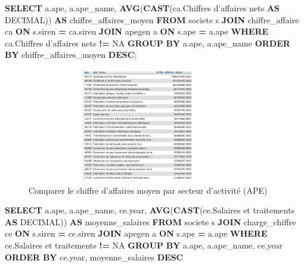 \documentclass[mstat,12pt]{unswthesis}
\newenvironment{Shaded}{\begin{snugshade}}{\end{snugshade}}
\newcommand{\DataTypeTok}[1]{\textcolor[rgb]{0.13,0.29,0.53}{#1}}
\newcommand{\FunctionTok}[1]{\textcolor[rgb]{0.13,0.29,0.53}{\textbf{#1}}}
\newcommand{\KeywordTok}[1]{\textcolor[rgb]{0.13,0.29,0.53}{\textbf{#1}}}
\newcommand{\NormalTok}[1]{#1}
\newcommand{\OperatorTok}[1]{\textcolor[rgb]{0.81,0.36,0.00}{\textbf{#1}}}
\newcommand{\StringTok}[1]{\textcolor[rgb]{0.31,0.60,0.02}{#1}}
\begin{document}
\begin{Shaded}
\begin{Highlighting}[]

\KeywordTok{SELECT} 
\NormalTok{  a.ape, }
\NormalTok{  a.ape\_name, }
  \FunctionTok{AVG}\NormalTok{(}\FunctionTok{CAST}\NormalTok{(ca.\textasciigrave{}Chiffres d’affaires nets\textasciigrave{} }\KeywordTok{AS} \DataTypeTok{DECIMAL}\NormalTok{)) }
  \KeywordTok{AS}\NormalTok{ chiffre\_affaires\_moyen }
\KeywordTok{FROM} 
\NormalTok{  societe s }
  \KeywordTok{JOIN}\NormalTok{ chiffre\_affaire ca }\KeywordTok{ON}\NormalTok{ s.siren }\OperatorTok{=}\NormalTok{ ca.siren }
  \KeywordTok{JOIN}\NormalTok{ apegen a }\KeywordTok{ON}\NormalTok{ s.ape }\OperatorTok{=}\NormalTok{ a.ape }
\KeywordTok{WHERE} 
\NormalTok{  ca.\textasciigrave{}Chiffres d’affaires nets\textasciigrave{} }\OperatorTok{!=} \StringTok{\textquotesingle{}NA\textquotesingle{}} 
\KeywordTok{GROUP} \KeywordTok{BY} 
\NormalTok{  a.ape, }
\NormalTok{  a.ape\_name }
\KeywordTok{ORDER} \KeywordTok{BY} 
\NormalTok{  chiffre\_affaires\_moyen }\KeywordTok{DESC}\NormalTok{;}
\end{Highlighting}
\end{Shaded}

\begin{figure}
\centering
\includegraphics[width=10cm,height=5cm]{image_sql/compere_APE.png}
\caption{Comparer le chiffre d'affaires moyen par secteur d'activité
(APE)}
\end{figure}

\begin{Shaded}
\begin{Highlighting}[]
\KeywordTok{SELECT} 
\NormalTok{  a.ape, }
\NormalTok{  a.ape\_name, }
\NormalTok{  ce.}\DataTypeTok{year}\NormalTok{, }
  \FunctionTok{AVG}\NormalTok{(}\FunctionTok{CAST}\NormalTok{(ce.\textasciigrave{}Salaires et traitements\textasciigrave{} }\KeywordTok{AS} \DataTypeTok{DECIMAL}\NormalTok{)) }\KeywordTok{AS}\NormalTok{ moyenne\_salaires }
\KeywordTok{FROM}\NormalTok{ societe s }\KeywordTok{JOIN}
\NormalTok{  charge\_chiffre ce }\KeywordTok{ON}\NormalTok{ s.siren }\OperatorTok{=}\NormalTok{ ce.siren }\KeywordTok{JOIN}\NormalTok{ apegen a }\KeywordTok{ON}\NormalTok{ s.ape }\OperatorTok{=}\NormalTok{ a.ape }\KeywordTok{WHERE}\NormalTok{ ce.\textasciigrave{}Salaires et traitements\textasciigrave{} }\OperatorTok{!=} \StringTok{\textquotesingle{}NA\textquotesingle{}} \KeywordTok{GROUP} \KeywordTok{BY} 
\NormalTok{  a.ape,}
\NormalTok{  a.ape\_name, }
\NormalTok{  ce.}\DataTypeTok{year} 
\KeywordTok{ORDER} \KeywordTok{BY} 
\NormalTok{  ce.}\DataTypeTok{year}\NormalTok{,}
\NormalTok{  moyenne\_salaires }\KeywordTok{DESC}
\end{Highlighting}
\end{Shaded}
\end{document}
